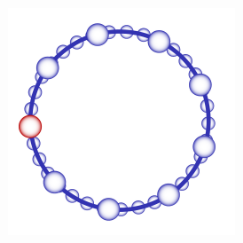 \documentclass[xcolor=pdftex,dvipsnames,table]{beamer}
\begin{document}
\begin{frame}
\begin{columns}
    \begin{center}
        \begin{overlayarea}{\textwidth}{\textheight}
            \includegraphics[width=6cm]{diagrams/ServiceHighlight}
        \end{overlayarea}
    \end{center}
    \end{columns}
\end{frame}
\end{document}
